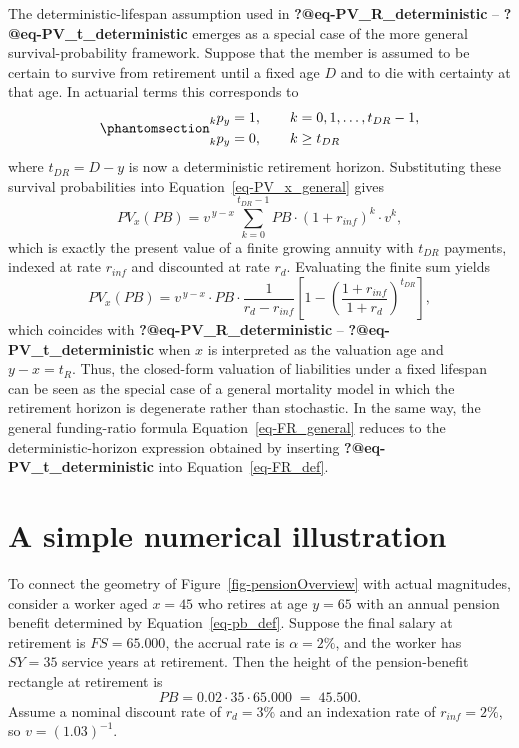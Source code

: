 \documentclass[
  letterpaper,
  DIV=11,
  numbers=noendperiod]{scrreprt}
\begin{document}
The deterministic-lifespan assumption used in
\textbf{?@eq-PV\_R\_deterministic} -- \textbf{?@eq-PV\_t\_deterministic}
emerges as a special case of the more general survival-probability
framework. Suppose that the member is assumed to be certain to survive
from retirement until a fixed age \(D\) and to die with certainty at
that age. In actuarial terms this corresponds to
\begin{equation}\protect\phantomsection\label{eq-survival}{
\begin{aligned}
    {}_k p_y &= 1, \qquad k = 0,1,\dots,t_{DR}-1, \\
    {}_k p_y &= 0, \qquad k \ge t_{DR}
\end{aligned}
}\end{equation} where \(t_{DR} = D - y\) is now a deterministic
retirement horizon. Substituting these survival probabilities into
Equation~\ref{eq-PV_x_general} gives \[
    PV_x(PB) = v^{\,y - x} \sum_{k=0}^{t_{DR}-1} PB \cdot (1 + r_{inf})^{k} \cdot v^{k},
\] which is exactly the present value of a finite growing annuity with
\(t_{DR}\) payments, indexed at rate \(r_{inf}\) and discounted at rate
\(r_d\). Evaluating the finite sum yields \[
    PV_x(PB) = v^{\,y - x} \cdot PB \cdot \frac{1}{r_d - r_{inf}} \left[1 - \left(\frac{1 + r_{inf}}{1 + r_d}\right)^{t_{DR}} \right],
\] which coincides with \textbf{?@eq-PV\_R\_deterministic} --
\textbf{?@eq-PV\_t\_deterministic} when \(x\) is interpreted as the
valuation age and \(y - x = t_R\). Thus, the closed-form valuation of
liabilities under a fixed lifespan can be seen as the special case of a
general mortality model in which the retirement horizon is degenerate
rather than stochastic. In the same way, the general funding-ratio
formula Equation~\ref{eq-FR_general} reduces to the
deterministic-horizon expression obtained by inserting
\textbf{?@eq-PV\_t\_deterministic} into Equation~\ref{eq-FR_def}.

\section{A simple numerical
illustration}\label{a-simple-numerical-illustration}

To connect the geometry of Figure~\ref{fig-pensionOverview} with actual
magnitudes, consider a worker aged \(x = 45\) who retires at age
\(y = 65\) with an annual pension benefit determined by
Equation~\ref{eq-pb_def}. Suppose the final salary at retirement is
\(FS = 65{.}000\), the accrual rate is \(\alpha = 2\%\), and the worker
has \(SY = 35\) service years at retirement. Then the height of the
pension-benefit rectangle at retirement is \[
    PB = 0.02 \cdot 35 \cdot 65{.}000 \;=\; 45{.}500.
\] Assume a nominal discount rate of \(r_d = 3\%\) and an indexation
rate of \(r_{inf} = 2\%\), so \(v = (1.03)^{-1}\).
\end{document}
